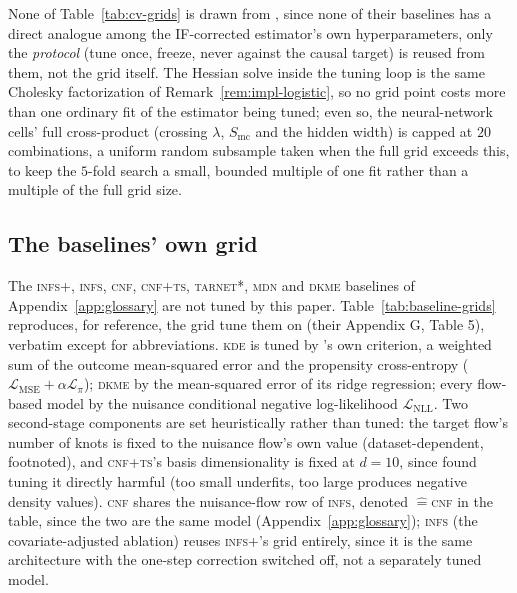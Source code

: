 \documentclass[11pt]{article}
\theoremstyle{plain}
\theoremstyle{definition}
\theoremstyle{remark}
\begin{document}
None of Table~\ref{tab:cv-grids} is drawn from \citet{melnychuk2023flows}, since none of their
baselines has a direct analogue among the IF-corrected estimator's own hyperparameters, only the
\emph{protocol} (tune once, freeze, never against the causal target) is reused from them, not the
grid itself. The Hessian solve inside the tuning loop is the same Cholesky factorization of
Remark~\ref{rem:impl-logistic}, so no grid point costs more than one ordinary fit of the estimator
being tuned; even so, the neural-network cells' full cross-product (crossing $\lambda$, $S_{\mathrm{mc}}$ and
the hidden width) is
capped at $20$ combinations, a uniform random subsample taken when the full grid exceeds this,
to keep the $5$-fold search a small, bounded multiple of one fit rather than a multiple of the
full grid size.

\subsection{The baselines' own grid}
\label{app:cv-baselines}

The \textsc{infs+}, \textsc{infs}, \textsc{cnf}, \textsc{cnf+ts}, \textsc{tarnet*}, \textsc{mdn}
and \textsc{dkme} baselines of Appendix~\ref{app:glossary} are not tuned by this paper.
Table~\ref{tab:baseline-grids} reproduces, for reference, the grid
\citet{melnychuk2023flows} tune them on (their Appendix G, Table 5), verbatim except for
abbreviations. \textsc{kde} is tuned by \citet{kim2018distributional}'s own criterion, a
weighted sum of the outcome mean-squared error and the propensity cross-entropy
($\mathcal{L}_{\mathrm{MSE}} + \alpha\mathcal{L}_\pi$); \textsc{dkme} by the mean-squared error
of its ridge regression; every flow-based model by the nuisance conditional negative
log-likelihood $\mathcal{L}_{\mathrm{NLL}}$. Two second-stage components are set heuristically
rather than tuned: the target flow's number of knots is fixed to the nuisance flow's own value
(dataset-dependent, footnoted), and \textsc{cnf+ts}'s basis dimensionality is fixed at $d=10$,
since \citeauthor{melnychuk2023flows} found tuning it directly harmful (too small
underfits, too large produces negative density values). \textsc{cnf} shares the nuisance-flow
row of \textsc{infs}, denoted $\hat=$\textsc{cnf} in the table, since the two are the same model
(Appendix~\ref{app:glossary}); \textsc{infs} (the covariate-adjusted ablation) reuses \textsc{infs+}'s
grid entirely, since it is the same architecture with the one-step correction switched off,
not a separately tuned model.
\end{document}
